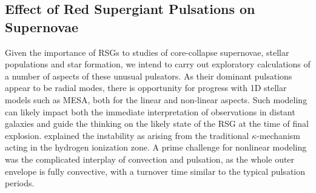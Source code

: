 \subsection{Effect of Red Supergiant Pulsations on Supernovae}

Given the importance of RSGs to studies of core-collapse supernovae, stellar populations and star formation, we intend to carry out exploratory calculations of a number of aspects of these unusual pulsators. As their dominant pulsations appear to be radial modes, there is opportunity for progress with 1D stellar models such as MESA, both for the linear and non-linear aspects. 
{\color{green} Such modeling can likely impact both the immediate interpretation of observations in distant galaxies and guide the thinking on the likely state of the RSG at the time of final explosion.} \citet{1997AampA...327..224H}  explained the instability  as arising from the traditional $\kappa$-mechanism acting in the hydrogen ionization zone. 
A prime challenge for nonlinear modeling was the complicated interplay of convection and pulsation, as the whole outer envelope is fully convective, with a turnover time similar to the typical pulsation periods.